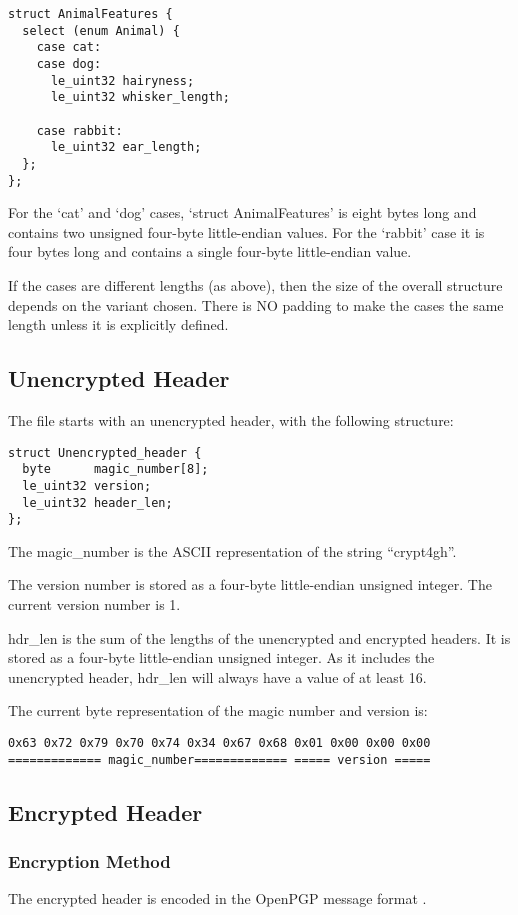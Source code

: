 \documentclass[10pt]{article}
\begin{document}
\begin{verbatim}
struct AnimalFeatures {
  select (enum Animal) {
    case cat:
    case dog:
      le_uint32 hairyness;
      le_uint32 whisker_length;

    case rabbit:
      le_uint32 ear_length;
  };
};
\end{verbatim}

For the `cat' and `dog' cases, `struct AnimalFeatures' is eight bytes long and contains two unsigned four-byte
little-endian values.
For the `rabbit' case it is four bytes long and contains a single four-byte little-endian value.

If the cases are different lengths (as above), then the size of the overall structure depends on the variant chosen.
There is NO padding to make the cases the same length unless it is explicitly defined.

\subsection{Unencrypted Header}

The file starts with an unencrypted header, with the following structure:

\begin{verbatim}
struct Unencrypted_header {
  byte      magic_number[8];
  le_uint32 version;
  le_uint32 header_len;
};
\end{verbatim}

The magic\_number is the ASCII representation of the string ``crypt4gh''.

The version number is stored as a four-byte little-endian unsigned integer.
The current version number is 1.

hdr\_len is the sum of the lengths of the unencrypted and encrypted headers.
It is stored as a four-byte little-endian unsigned integer.
As it includes the unencrypted header, hdr\_len will always have a value of at least 16.

The current byte representation of the magic number and version is:
\begin{verbatim}
0x63 0x72 0x79 0x70 0x74 0x34 0x67 0x68 0x01 0x00 0x00 0x00
============= magic_number============= ===== version =====
\end{verbatim}

\subsection{Encrypted Header}
\subsubsection{Encryption Method}
The encrypted header is encoded in the OpenPGP message format \cite{RFC4880}.
\end{document}
